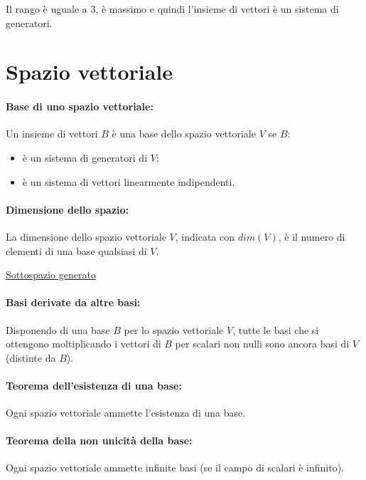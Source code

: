 \documentclass[a4paper]{article}
\begin{document}
        Il rango \`{e} uguale a $3$, \`{e} massimo e quindi l'insieme di vettori \`{e} un sistema di generatori.


        \section*{Spazio vettoriale}
        \paragraph{Base di uno spazio vettoriale:}
        Un insieme di vettori $B$ \`{e} una base dello spazio vettoriale $V$ se $B$:
        \begin{itemize}
                \item \`{e} un sistema di generatori di $V$;
                \item \`{e} un sistema di vettori linearmente indipendenti.
        \end{itemize}

        \paragraph{Dimensione dello spazio:}
        La dimensione dello spazio vettoriale $V$, indicata con $dim(V)$, \`{e} il numero di elementi di una base qualsiasi di $V$.

        \href{http://www.youmath.it/domande-a-risposte/view/1318-quale-il-sottospazio-generato-da-questi-3-vettori-di-r3.html}{Sottospazio generato}

        \paragraph{Basi derivate da altre basi:}
        Disponendo di una base $B$ per lo spazio vettoriale $V$, tutte le basi che si ottengono moltiplicando i vettori di $B$ per scalari non nulli sono ancora basi di $V$ (distinte da $B$).

        \paragraph{Teorema dell'esistenza di una base:}
        Ogni spazio vettoriale ammette l'esistenza di una base.

        \paragraph{Teorema della non unicit\`{a} della base:}
        Ogni spazio vettoriale ammette infinite basi (se il campo di scalari \`{e} infinito).
\end{document}
